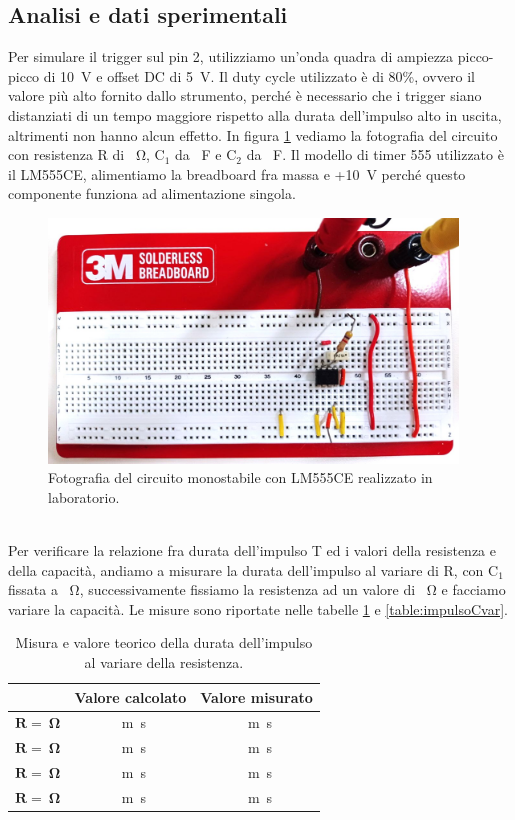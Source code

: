 \documentclass{report}
\begin{document}
\subsection{Analisi e dati sperimentali}
Per simulare il trigger sul pin 2, utilizziamo un'onda quadra di ampiezza picco-picco di \SI{10}{\volt} e offset DC di \SI{5}{\volt}. Il duty cycle utilizzato è di 80\%, ovvero il valore più alto fornito dallo strumento, perché è necessario che i trigger siano distanziati di un tempo maggiore rispetto alla durata dell'impulso alto in uscita, altrimenti non hanno alcun effetto. In figura \ref{figura:circuito2} vediamo la fotografia del circuito con resistenza R di \SI{}{\ohm}, $\mathrm{C_1}$ da  \SI{}{\farad} e $\mathrm{C_2}$ da  \SI{}{\farad}. Il modello di timer 555 utilizzato è il LM555CE, alimentiamo la breadboard fra massa e +\SI{10}{\volt} perché questo componente funziona ad alimentazione singola.
\begin{figure}[h!]
	\centering
	\includegraphics[height=6.5cm]{immagini/circuito2}
	\caption{Fotografia del circuito monostabile con LM555CE realizzato in laboratorio.}
	\label{figura:circuito2}
\end{figure}
\\Per verificare la relazione fra durata dell'impulso T ed i valori della resistenza e della capacità, andiamo a misurare la durata dell'impulso al variare di R, con $\mathrm{C_1}$ fissata a \SI{}{\ohm}, successivamente fissiamo la resistenza ad un valore di \SI{}{\ohm} e facciamo variare la capacità. Le misure sono riportate nelle tabelle \ref{table:impulsoRvar} e \ref{table:impulsoCvar}.
\begin{table}[h!]
	\centering
	\begin{tabular}{|c|c|c|}
		\cline{2-3} 
		\multicolumn{1}{c|}{} & \textbf{Valore calcolato} & \textbf{Valore misurato}\\ 
		\hline
		$\mathbf{R = \SI{}{\ohm}}$ & \SI{}{m\second} & \SI{}{m\second} \\ 
		\hline
		$\mathbf{R = \SI{}{\ohm}}$ & \SI{}{m\second} & \SI{}{m\second} \\ 
		\hline
		$\mathbf{R = \SI{}{\ohm}}$ & \SI{}{m\second} & \SI{}{m\second} \\ 
		\hline
		$\mathbf{R = \SI{}{\ohm}}$ & \SI{}{m\second} & \SI{}{m\second} \\ 
		\hline
	\end{tabular}
	\caption{Misura e valore teorico della durata dell'impulso al variare della resistenza.}
	\label{table:impulsoRvar}
\end{table}
\end{document}
